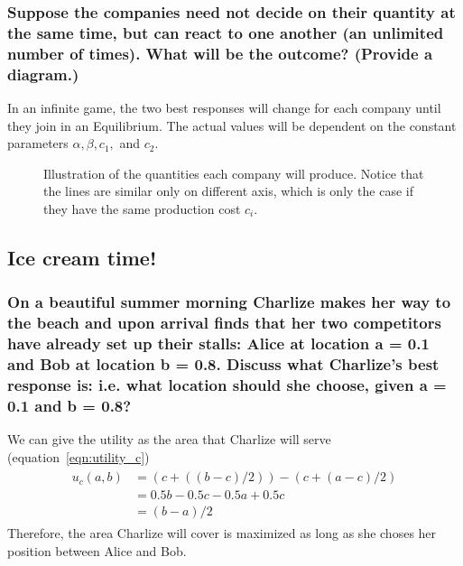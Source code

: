 \documentclass[11pt]{article}
\begin{document}
    \subsubsection{Suppose the companies need not decide on their quantity at the same time, but can react to one another (an unlimited number of times). What will be the outcome? (Provide a diagram.)}
    In an infinite game, the two best responses will change for each company until they join in an Equilibrium. The actual values
    will be dependent on the constant parameters $\alpha, \beta, c_1,$ and $c_2$.
    \begin{figure}[h]
        \caption{Illustration of the quantities each company will produce. Notice that the lines are similar only on different axis,
            which is only the case if they have the same production cost $c_i$.}
    \end{figure}

    \subsection{Ice cream time!}

    \subsubsection{On a beautiful summer morning Charlize makes her way to the beach and upon arrival finds that her two competitors have already set up their stalls: Alice at location a = 0.1 and Bob at location b = 0.8. Discuss what Charlize’s best response is: i.e. what location should she choose, given a = 0.1 and b = 0.8?}
    We can give the utility as the area that Charlize will serve (equation~\ref{eqn:utility_c})
    \begin{align}
        \begin{split}
            u_c(a, b)&=(c+((b-c)/2)) - (c+(a-c)/2)\\
            & = 0.5b - 0.5c - 0.5a + 0.5c\\
            & = (b-a)/2
        \end{split}
        \label{eqn:utility_c}
    \end{align}
    Therefore, the area Charlize will cover is maximized as long as she choses her position between Alice and Bob.
\end{document}
